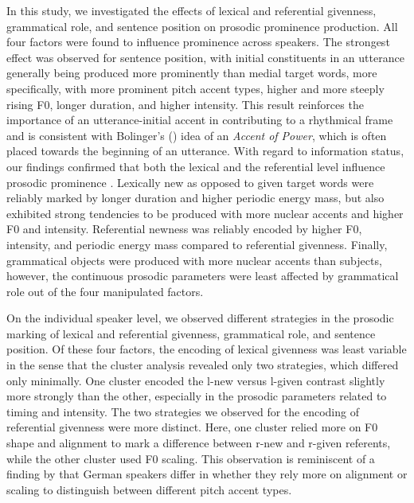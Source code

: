 In this study, we investigated the effects of lexical and referential givenness, grammatical role, and sentence position on prosodic prominence production. All four factors were found to influence prominence across speakers. The strongest effect was observed for sentence position, with initial constituents in an utterance generally being produced more prominently than medial target words, more specifically, with more prominent pitch accent types, higher and more steeply rising F0, longer duration, and higher intensity. This result reinforces the importance of an utterance-initial accent in contributing to a rhythmical frame \citep{baumannInfluenceInformativenessProsody2021} and is consistent with Bolinger's (\citeyear{bolingerIntonationItsParts1986}) idea of an \textit{Accent of Power}, which is often placed towards the beginning of an utterance. With regard to information status, our findings confirmed that both the lexical and the referential level influence prosodic prominence \citep{baumannReferentialLexicalGivenness2012, baumannCoreferenceLexicalGivenness2013}. Lexically new as opposed to given target words were reliably marked by longer duration and higher periodic energy mass, but also exhibited strong tendencies to be produced with more nuclear accents and higher F0 and intensity. Referential newness was reliably encoded by higher F0, intensity, and periodic energy mass compared to referential givenness. Finally, grammatical objects were produced with more nuclear accents than subjects, however, the continuous prosodic parameters were least affected by grammatical role out of the four manipulated factors.

On the individual speaker level, we observed different strategies in the prosodic marking of lexical and referential givenness, grammatical role, and sentence position. Of these four factors, the encoding of lexical givenness was least variable in the sense that the cluster analysis revealed only two strategies, which differed only minimally. One cluster encoded the l-new versus l-given contrast slightly more strongly than the other, especially in the prosodic parameters related to timing and intensity. The two strategies we observed for the encoding of referential givenness were more distinct. Here, one cluster relied more on F0 shape and alignment to mark a difference between r-new and r-given referents, while the other cluster used F0 scaling. This observation is reminiscent of a finding by \citet{niebuhrAreThereShapers2011} that German speakers differ in whether they rely more on alignment or scaling to distinguish between different pitch accent types.

